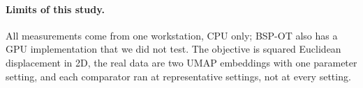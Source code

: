 \documentclass[11pt]{article}
\begin{document}
\paragraph{Limits of this study.} All measurements come from one workstation, CPU only;
BSP-OT also has a GPU implementation that we did not test. The objective is squared
Euclidean displacement in 2D, the real data are two UMAP embeddings with one parameter
setting, and each comparator ran at representative settings, not at every setting.
\label{page:body-end}

\clearpage


\end{document}
